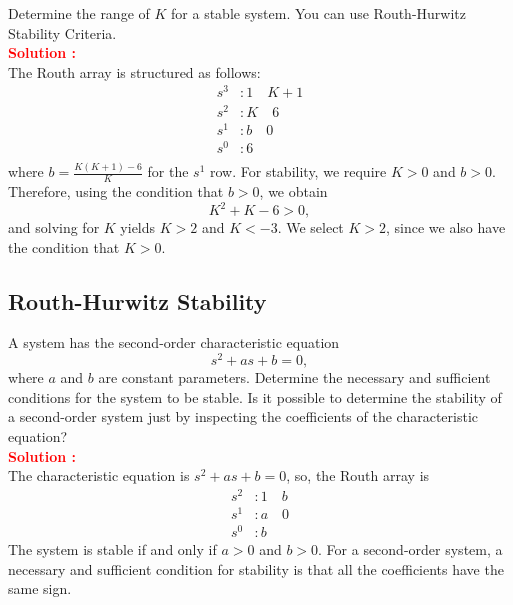 \documentclass[12pt]{article}
\begin{document}
Determine the range of \(K\) for a stable system. You can use Routh-Hurwitz Stability Criteria.\\


\textbf{\textcolor{red}{Solution :}} \\
The Routh array is structured as follows:
\begin{align*}
    s^3 & : 1 \quad K+1 \\
    s^2 & : K \quad 6 \\
    s^1 & : b \quad 0 \\
    s^0 & : 6 \\
\end{align*}
where \(b = \frac{K(K + 1) - 6}{K}\) for the \(s^1\) row. For stability, we require \(K > 0\) and \(b > 0\). Therefore, using the condition that \(b > 0\), we obtain
\begin{equation}
    K^2 + K - 6 > 0,
\end{equation}
and solving for \(K\) yields \(K > 2\) and \(K < -3\). We select \(K > 2\), since we also have the condition that \(K > 0\).

\clearpage
\subsection{Routh-Hurwitz Stability}


A system has the second-order characteristic equation
\begin{equation}
    s^2 + as + b = 0,
\end{equation}
where \(a\) and \(b\) are constant parameters. Determine the necessary and sufficient conditions for the system to be stable. Is it possible to determine the stability of a second-order system just by inspecting the coefficients of the characteristic equation?\\


\textbf{\textcolor{red}{Solution :}} \\
The characteristic equation is $s^2 + as + b = 0$, so, the Routh array is
\begin{align*}
    s^2 & : 1 \quad b \\
    s^1 & : a \quad 0 \\
    s^0 & : b
\end{align*}
The system is stable if and only if $a > 0$ and $b > 0$. For a second-order system, a necessary and sufficient condition for stability is that all the coefficients have the same sign.
\end{document}

